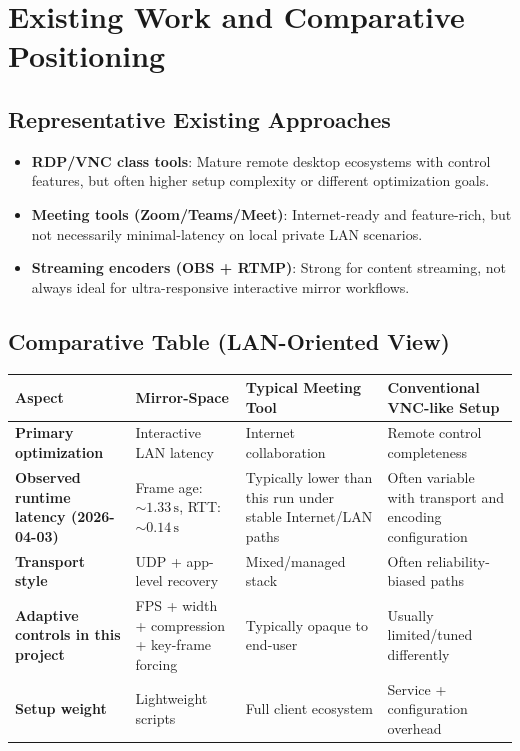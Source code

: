 \documentclass[12pt,a4paper]{article}
\begin{document}
\newpage

\section{Existing Work and Comparative Positioning}

\subsection{Representative Existing Approaches}
\begin{itemize}[leftmargin=*, itemsep=4pt]
  \item \textbf{RDP/VNC class tools}: Mature remote desktop ecosystems with control features, but often higher setup complexity or different optimization goals.
  \item \textbf{Meeting tools (Zoom/Teams/Meet)}: Internet-ready and feature-rich, but not necessarily minimal-latency on local private LAN scenarios.
  \item \textbf{Streaming encoders (OBS + RTMP)}: Strong for content streaming, not always ideal for ultra-responsive interactive mirror workflows.
\end{itemize}

\subsection{Comparative Table (LAN-Oriented View)}
\begin{center}
\renewcommand{\arraystretch}{1.3}
\begin{tabularx}{\textwidth}{>{\bfseries}l X X X}
\toprule
Aspect & Mirror-Space & Typical Meeting Tool & Conventional VNC-like Setup \\
\midrule
Primary optimization & Interactive LAN latency & Internet collaboration & Remote control completeness \\
Observed runtime latency (2026-04-03) & Frame age: \(\sim 1.33\,\mathrm{s}\), RTT: \(\sim 0.14\,\mathrm{s}\) & Typically lower than this run under stable Internet/LAN paths & Often variable with transport and encoding configuration \\
Transport style & UDP + app-level recovery & Mixed/managed stack & Often reliability-biased paths \\
Adaptive controls in this project & FPS + width + compression + key-frame forcing & Typically opaque to end-user & Usually limited/tuned differently \\
Setup weight & Lightweight scripts & Full client ecosystem & Service + configuration overhead \\
\bottomrule
\end{tabularx}
\end{center}
\end{document}
